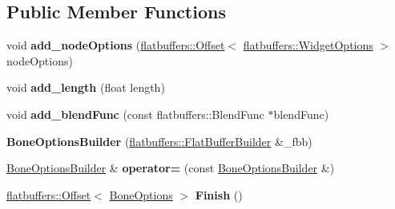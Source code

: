 \subsection*{Public Member Functions}
\begin{DoxyCompactItemize}
\item 
\mbox{\label{structflatbuffers_1_1BoneOptionsBuilder_a44541aeb74988ea5d9d57aabb386b486}} 
void {\bfseries add\+\_\+node\+Options} (\hyperlink{structflatbuffers_1_1Offset}{flatbuffers\+::\+Offset}$<$ \hyperlink{structflatbuffers_1_1WidgetOptions}{flatbuffers\+::\+Widget\+Options} $>$ node\+Options)
\item 
\mbox{\label{structflatbuffers_1_1BoneOptionsBuilder_a854cf2871fd7b72f14304967bdf5179c}} 
void {\bfseries add\+\_\+length} (float length)
\item 
\mbox{\label{structflatbuffers_1_1BoneOptionsBuilder_aca118599b7357a52abf75478af4b3957}} 
void {\bfseries add\+\_\+blend\+Func} (const flatbuffers\+::\+Blend\+Func $\ast$blend\+Func)
\item 
\mbox{\label{structflatbuffers_1_1BoneOptionsBuilder_a063e2804fec2c5a8843c7ddbe7226d65}} 
{\bfseries Bone\+Options\+Builder} (\hyperlink{classflatbuffers_1_1FlatBufferBuilder}{flatbuffers\+::\+Flat\+Buffer\+Builder} \&\+\_\+fbb)
\item 
\mbox{\label{structflatbuffers_1_1BoneOptionsBuilder_a4220860642e64cd18e5690881213c612}} 
\hyperlink{structflatbuffers_1_1BoneOptionsBuilder}{Bone\+Options\+Builder} \& {\bfseries operator=} (const \hyperlink{structflatbuffers_1_1BoneOptionsBuilder}{Bone\+Options\+Builder} \&)
\item 
\mbox{\label{structflatbuffers_1_1BoneOptionsBuilder_a980c820bacd96cfeaaf3b337775de913}} 
\hyperlink{structflatbuffers_1_1Offset}{flatbuffers\+::\+Offset}$<$ \hyperlink{structflatbuffers_1_1BoneOptions}{Bone\+Options} $>$ {\bfseries Finish} ()
\item 
\mbox{\label{structflatbuffers_1_1BoneOptionsBuilder_a44541aeb74988ea5d9d57aabb386b486}} 

\end{DoxyCompactItemize}
